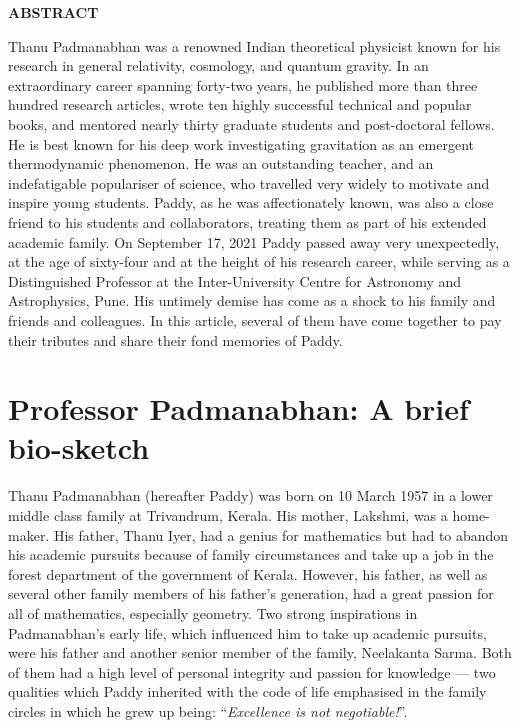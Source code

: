 \documentclass[prd, preprint, longbibliography, 11pt]{revtex4-1}
\begin{document}
\centerline{\bf ABSTRACT}
\noindent Thanu Padmanabhan was a renowned Indian theoretical physicist known for his research in general relativity, cosmology, and quantum gravity. In an extraordinary career spanning forty-two years, he published more than three hundred research articles, wrote ten highly successful technical and popular books, and mentored nearly thirty graduate students and post-doctoral fellows. He is best known for his deep work investigating gravitation as an emergent thermodynamic phenomenon. He was an outstanding teacher, and an indefatigable populariser of science, who travelled very widely to motivate and inspire young students. Paddy, as he was affectionately known, was also a close friend to his students and collaborators, treating them as part of his extended academic family. On September 17, 2021 Paddy passed away very unexpectedly, at the age of sixty-four and at the height of his research career, while serving as a Distinguished Professor at the Inter-University Centre for Astronomy and Astrophysics, Pune. His untimely demise has come as a shock to his family and friends and colleagues. In this article, several  of them have come together to pay their tributes and share their fond memories of Paddy.

\newpage

\section{Professor Padmanabhan: A brief bio-sketch}




\noindent  Thanu Padmanabhan (hereafter Paddy)  was born on 10 March 1957 in a
lower middle class family at Trivandrum, Kerala.  
His mother, Lakshmi, was a home-maker. His father, Thanu Iyer, had  a
genius for mathematics but had to abandon his academic pursuits
because of family circumstances and take up a job in the forest
department of the government of Kerala.
However, his father, as well as several other family members of his
father's generation,  had a great passion for all of mathematics,
especially geometry.  
Two strong inspirations in Padmanabhan's early life, which influenced
him to take up academic pursuits, were his father and another senior
member of the family, Neelakanta Sarma.
Both of them had a high level of personal integrity and passion for
knowledge --- two qualities which Paddy inherited  with  the code of
life emphasised in the family circles in which he grew up being:
``\textit{Excellence is not negotiable!}''. 
\end{document}
